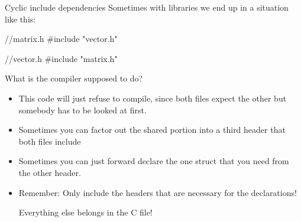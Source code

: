 \documentclass[10pt,graphics,aspectratio=169,table]{beamer}
\begin{document}
\begin{frame}[fragile]{Cyclic include dependencies}
    Sometimes with libraries we end up in a situation like this:

    \begin{codeblock}
//matrix.h
#include "vector.h"

//vector.h
#include "matrix.h"
    \end{codeblock}

    What is the compiler supposed to do?
    \pause
    \begin{itemize}
        \item This code will just refuse to compile, since both files expect the other
        but somebody has to be looked at first. 
        
        \item Sometimes you can factor out the shared portion into a third header that
        both files include
        
        \item Sometimes you can just forward declare the one struct
        that you need from the other header. 

        \item Remember: Only include the headers that are 
              necessary for the declarations!
              
              Everything else belongs in the C file!
    \end{itemize}
\end{frame}
\end{document}
